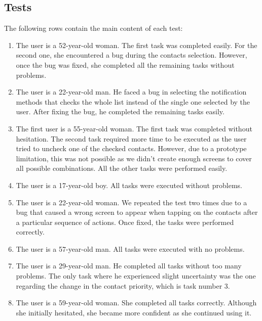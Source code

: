 \documentclass[12pt]{article}
\begin{document}
\subsection{Tests}
The following rows contain the main content of each test:
\begin{enumerate}
    \item The user is a 52-year-old woman. The first task was completed 
    easily. For the second one, she encountered a bug during the contacts 
    selection. However, once the bug was fixed, she completed all the 
    remaining tasks without problems.

    \item The user is a 22-year-old man. He faced a bug in selecting the 
    notification methods that checks the whole list instead of the single 
    one selected by the user. After fixing the bug, he completed the 
    remaining tasks easily.

    \item The first user is a 55-year-old woman. The first task was completed 
    without hesitation. The second task required more time to be 
    executed as the user tried to uncheck one of the checked contacts. 
    However, due to a prototype limitation, this was not possible as we 
    didn't create enough screens to cover all possible combinations. 
    All the other tasks were performed easily. 

    \item The user is a 17-year-old boy. All tasks were executed 
    without problems. 

    \item The user is a 22-year-old woman. We repeated the test two times 
    due to a bug that caused a wrong screen to appear when tapping on the contacts after a particular sequence of actions. Once fixed, the tasks 
    were performed correctly. 

    \item The user is a 57-year-old man. All tasks were executed with no 
    problems.

    \item The user is a 29-year-old man. He completed all tasks without 
    too many problems. The only task where he experienced slight uncertainty 
    was the one regarding the change in the contact priority, which is task 
    number 3.

    \item The user is a 59-year-old woman. She completed all tasks 
    correctly. Although she initially hesitated, she became more confident
    as she continued using it. 


\end{enumerate}
\end{document}
